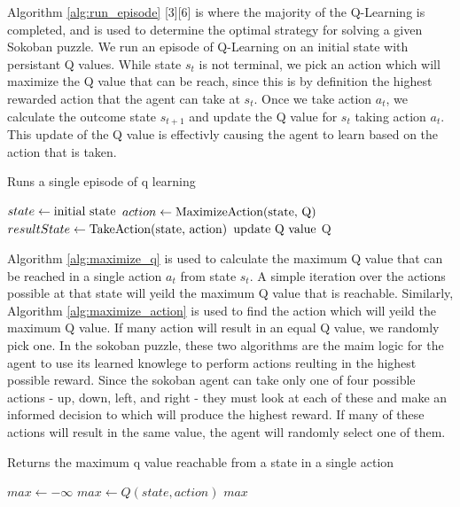 \documentclass[times, 10pt,twocolumn]{article}
\begin{document}
Algorithm \ref{alg:run_episode} [3][6] is where the majority of the Q-Learning is completed, and is used to determine the optimal strategy for solving a given Sokoban puzzle.  We run an episode of Q-Learning on an initial state with persistant Q values.  While state $s_t$ is not terminal, we pick an action which will maximize the Q value that can be reach, since this is by definition the highest rewarded action that the agent can take at $s_t$.  Once we take action $a_t$, we calculate the outcome state $s_{t+1}$ and update the Q value for $s_t$ taking action $a_t$.  This update of the Q value is effectivly causing the agent to learn based on the action that is taken.

\begin{algorithm}
  \caption{Runs a single episode of q learning}
  \begin{algorithmic}[3]
      \State $state\gets \textnormal{initial state}$
        \State $action\gets \textnormal{MaximizeAction(state, Q)}$
        \State $resultState\gets \textnormal{TakeAction(state, action)}$
        \State $\textnormal{update Q value}$
      \EndWhile
      \State \Return Q
    \EndFunction
  \end{algorithmic}
  \label{alg:run_episode}
\end{algorithm}

Algorithm \ref{alg:maximize_q} is used to calculate the maximum Q value that can be reached in a single action $a_t$ from state $s_t$.  A simple iteration over the actions possible at that state will yeild the maximum Q value that is reachable.  Similarly, Algorithm \ref{alg:maximize_action} is used to find the action which will yeild the maximum Q value.  If many action will result in an equal Q value, we randomly pick one.  In the sokoban puzzle, these two algorithms are the maim logic for the agent to use its learned knowlege to perform actions reulting in the highest possible reward.  Since the sokoban agent can take only one of four possible actions - up, down, left, and right - they must look at each of these and make an informed decision to which will produce the highest reward.  If many of these actions will result in the same value, the agent will randomly select one of them.

\begin{algorithm}
  \caption{Returns the maximum q value reachable from a state in a single action}
  \begin{algorithmic}[4]
      \State $max\gets -\infty$
          \State $max\gets Q(state, action)$
        \EndIf
      \EndFor
      \State \Return $max$
    \EndFunction
  \end{algorithmic}
  \label{alg:maximize_q}
\end{algorithm}
\end{document}
